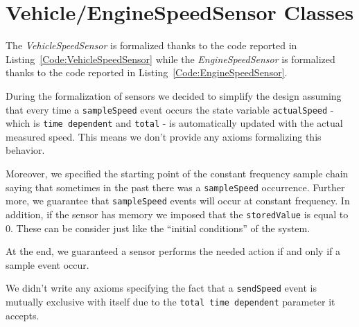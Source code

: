 \section{Vehicle/EngineSpeedSensor Classes}
\label{Section:SpeedSensors}
The \emph{VehicleSpeedSensor} is formalized thanks to the code reported in Listing~\ref{Code:VehicleSpeedSensor} while the \emph{EngineSpeedSensor} is formalized thanks to the code reported in Listing~\ref{Code:EngineSpeedSensor}.

During the formalization of sensors we decided to simplify the design assuming that every time a \texttt{sampleSpeed} event occurs the state variable \texttt{actualSpeed} - which is \texttt{time dependent} and \texttt{total} - is automatically updated with the actual measured speed. This means we don't provide any axioms formalizing this behavior.

Moreover, we specified the starting point of the constant frequency sample chain saying that sometimes in the past there was a \texttt{sampleSpeed} occurrence. Further more, we guarantee that \texttt{sampleSpeed} events will occur at constant frequency. In addition, if the sensor has memory we imposed that the \texttt{storedValue} is equal to 0. These can be consider just like the ``initial conditions'' of the system.

At the end, we guaranteed a sensor performs the needed action if and only if a sample event occur.

We didn't write any axioms specifying the fact that a \texttt{sendSpeed} event is mutually exclusive with itself due to the \texttt{total time dependent} parameter it accepts.




